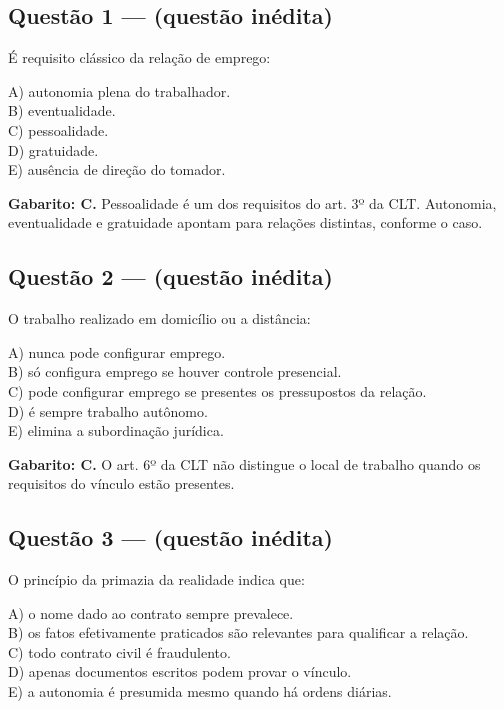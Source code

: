 \documentclass[11pt,a4paper]{article}
\begin{document}
\subsection*{Questão 1 — (questão inédita)}

É requisito clássico da relação de emprego:

A) autonomia plena do trabalhador. \\ B) eventualidade. \\ C) pessoalidade. \\ D) gratuidade. \\ E) ausência de direção do tomador.

\begin{alerta}
\textbf{Gabarito: C.} Pessoalidade é um dos requisitos do art. 3º da CLT. Autonomia, eventualidade e gratuidade apontam para relações distintas, conforme o caso.
\end{alerta}

\subsection*{Questão 2 — (questão inédita)}

O trabalho realizado em domicílio ou a distância:

A) nunca pode configurar emprego. \\ B) só configura emprego se houver controle presencial. \\ C) pode configurar emprego se presentes os pressupostos da relação. \\ D) é sempre trabalho autônomo. \\ E) elimina a subordinação jurídica.

\begin{alerta}
\textbf{Gabarito: C.} O art. 6º da CLT não distingue o local de trabalho quando os requisitos do vínculo estão presentes.
\end{alerta}

\subsection*{Questão 3 — (questão inédita)}

O princípio da primazia da realidade indica que:

A) o nome dado ao contrato sempre prevalece. \\ B) os fatos efetivamente praticados são relevantes para qualificar a relação. \\ C) todo contrato civil é fraudulento. \\ D) apenas documentos escritos podem provar o vínculo. \\ E) a autonomia é presumida mesmo quando há ordens diárias.
\end{document}
